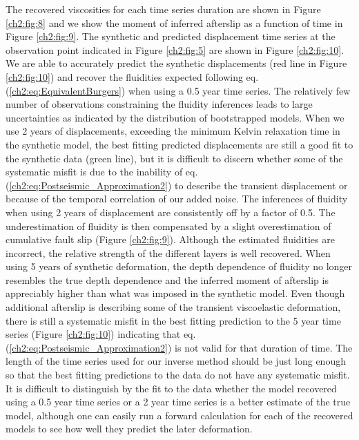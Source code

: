 The recovered viscosities for each time series duration are shown in
Figure \ref{ch2:fig:8} and we show the moment of inferred afterslip as
a function of time in Figure \ref{ch2:fig:9}. The synthetic and
predicted displacement time series at the observation point indicated
in Figure \ref{ch2:fig:5} are shown in Figure \ref{ch2:fig:10}.  We
are able to accurately predict the synthetic displacements (red line
in Figure \ref{ch2:fig:10}) and recover the fluidities expected
following eq. (\ref{ch2:eq:EquivalentBurgers}) when using a 0.5 year
time series. The relatively few number of observations constraining
the fluidity inferences leads to large uncertainties as indicated by
the distribution of bootstrapped models.  When we use 2 years of
displacements, exceeding the minimum Kelvin relaxation time in the
synthetic model, the best fitting predicted displacements are still a
good fit to the synthetic data (green line), but it is difficult to
discern whether some of the systematic misfit is due to the inability
of eq. (\ref{ch2:eq:Postseismic_Approximation2}) to describe the
transient displacement or because of the temporal correlation of our
added noise.  The inferences of fluidity when using 2 years of
displacement are consistently off by a factor of 0.5.  The
underestimation of fluidity is then compensated by a slight
overestimation of cumulative fault slip (Figure \ref{ch2:fig:9}).
Although the estimated fluidities are incorrect, the relative strength
of the different layers is well recovered.  When using 5 years of
synthetic deformation, the depth dependence of fluidity no longer
resembles the true depth dependence and the inferred moment of
afterslip is appreciably higher than what was imposed in the synthetic
model. Even though additional afterslip is describing some of the
transient viscoelastic deformation, there is still a systematic misfit
in the best fitting prediction to the 5 year time series (Figure
\ref{ch2:fig:10}) indicating that eq.
(\ref{ch2:eq:Postseismic_Approximation2}) is not valid for that
duration of time.  The length of the time series used for our inverse
method should be just long enough so that the best fitting predictions
to the data do not have any systematic misfit.  It is difficult to
distinguish by the fit to the data whether the model recovered using a
0.5 year time series or a 2 year time series is a better estimate of
the true model, although one can easily run a forward calculation for
each of the recovered models to see how well they predict the later
deformation.


